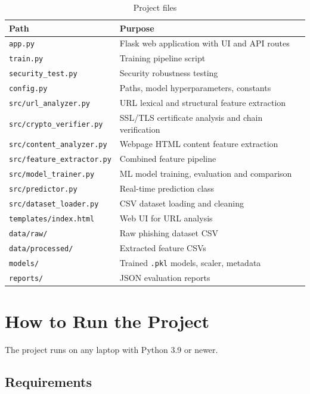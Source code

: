 \documentclass[11pt,a4paper]{article}
\begin{document}
\begin{table}[H]
\centering
\small
\begin{tabularx}{\textwidth}{@{}p{6cm}L@{}}
\toprule
\textbf{Path} & \textbf{Purpose} \\ \midrule
\texttt{app.py} & Flask web application with UI and API routes \\
\texttt{train.py} & Training pipeline script \\
\texttt{security\_test.py} & Security robustness testing \\
\texttt{config.py} & Paths, model hyperparameters, constants \\
\texttt{src/url\_analyzer.py} & URL lexical and structural feature extraction \\
\texttt{src/crypto\_verifier.py} & SSL/TLS certificate analysis and chain verification \\
\texttt{src/content\_analyzer.py} & Webpage HTML content feature extraction \\
\texttt{src/feature\_extractor.py} & Combined feature pipeline \\
\texttt{src/model\_trainer.py} & ML model training, evaluation and comparison \\
\texttt{src/predictor.py} & Real-time prediction class \\
\texttt{src/dataset\_loader.py} & CSV dataset loading and cleaning \\
\texttt{templates/index.html} & Web UI for URL analysis \\
\texttt{data/raw/} & Raw phishing dataset CSV \\
\texttt{data/processed/} & Extracted feature CSVs \\
\texttt{models/} & Trained \texttt{.pkl} models, scaler, metadata \\
\texttt{reports/} & JSON evaluation reports \\ \bottomrule
\end{tabularx}
\caption{Project files}
\end{table}

\clearpage
\section{How to Run the Project}

The project runs on any laptop with Python 3.9 or newer.

\subsection{Requirements}
\end{document}
